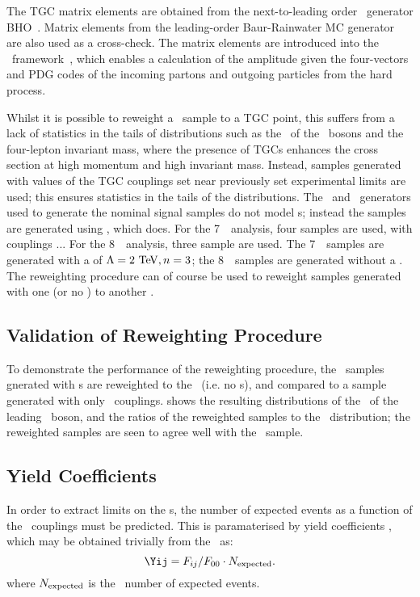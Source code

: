 The TGC matrix elements are obtained from the next-to-leading order \mc\
generator BHO~\cite{bho}. Matrix elements from the leading-order Baur-Rainwater
MC generator~\cite{Baur:1994au} are also used as a cross-check. The matrix
elements are introduced into the \AfterBurner\ framework~\cite{Bella:2008wc},
which enables a calculation of the amplitude given the four-vectors and PDG
codes of the incoming partons and outgoing particles from the hard process. 

Whilst it is possible to reweight a \sm\ sample to a TGC point, this suffers
from a lack of statistics in the tails of distributions such as the \pt\ of the
\Z\ bosons and the four-lepton invariant mass, where the presence of TGCs
enhances the cross section at high momentum and high invariant mass. Instead,
samples generated with values of the TGC couplings set near previously set
experimental limits are used; this ensures statistics in the tails of the
distributions. The \powhegBox\ and \ggZZ\ generators used to generate the nominal signal
samples do not model \TGC s; instead the samples are generated using \sherpa,
which does. For the 7~\tev\ analysis, four samples are used, with couplings
... For the 8~\tev\ analysis, three sample are used. The 7~\tev\ samples are
generated with a \formfactor of $\Lambda=2\tev,n=3$; the 8~\tev\ samples are
generated without a \formfactor. The reweighting procedure can of course be used to
reweight samples generated with one \formfactor (or no \formfactor) to another
\formfactor.

\subsection{Validation of Reweighting Procedure}

To demonstrate the performance of the reweighting procedure, the \sherpa\
samples gnerated with \TGC s are reweighted to the \sm\ (i.e. no \TGC s), and
compared to a sample generated with only \sm\ couplings. \fig{} shows the
resulting distributions of the \pt\ of the leading \Z\ boson, and the ratios of
the reweighted samples to the \sm\ distribution; the reweighted samples are seen
to agree well with the \sm\ sample.

\subsection{Yield Coefficients}

In order to extract limits on the \TGC s, the number of expected events as a
function of the \TGC\ couplings must be predicted. This is paramaterised by
yield coefficients \Yij, which may be obtained trivially from the \Fij\ as:
\begin{equation}
\Yij = F_{ij}/F_{00}\cdot{N_{\rm expected}}.
\end{equation}
where $N_{\rm expected}$ is the \sm\ number of expected events.

